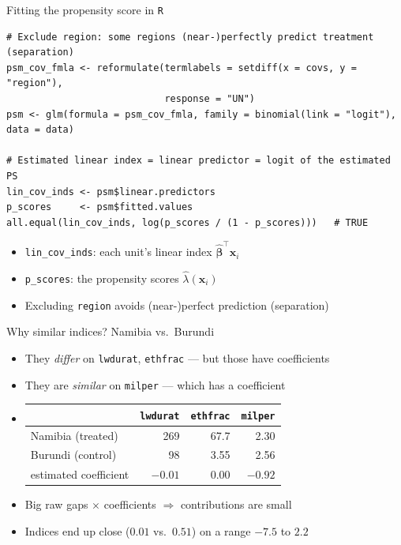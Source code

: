 \documentclass[table, xcolor = {dvipsnames}, 9pt]{beamer}
\theoremstyle{plain}
\newcommand{\mh}[1]{{\color{magenta}{#1}}}
\begin{document}
\begin{frame}[fragile]{Fitting the propensity score in \texttt{R}}
\begin{lstlisting}[style=Rstyle, basicstyle=\ttfamily\tiny, frame=single]
# Exclude region: some regions (near-)perfectly predict treatment (separation)
psm_cov_fmla <- reformulate(termlabels = setdiff(x = covs, y = "region"),
                            response = "UN")
psm <- glm(formula = psm_cov_fmla, family = binomial(link = "logit"), data = data)

# Estimated linear index = linear predictor = logit of the estimated PS
lin_cov_inds <- psm$linear.predictors
p_scores     <- psm$fitted.values
all.equal(lin_cov_inds, log(p_scores / (1 - p_scores)))   # TRUE
\end{lstlisting}
\begin{itemize} \vfill
\item \texttt{lin\_cov\_inds}: each unit's \mh{estimated} linear index $\bm{\hat{\beta}}^{\top}\bm{x}_i$ \vfill
\item \texttt{p\_scores}: the \mh{estimated} propensity scores $\hat{\lambda}(\bm{x}_i)$ \vfill
\item Excluding \texttt{region} avoids (near-)perfect prediction (separation) \vfill
\end{itemize}
\end{frame}
\begin{frame}{Why similar indices? Namibia vs.\ Burundi}
\vfill
\begin{itemize} \vfill
\item They \emph{differ} on \texttt{lwdurat}, \texttt{ethfrac} --- but those have \mh{small} coefficients \vfill
\item They are \emph{similar} on \texttt{milper} --- which has a \mh{large} coefficient \vfill
\item[]
\footnotesize
\begin{table}[H]
\centering
\begin{tabular}{lrrr}
\toprule
 & \texttt{lwdurat} & \texttt{ethfrac} & \texttt{milper} \\
\midrule
Namibia (treated) & 269 & 67.7 & 2.30 \\
Burundi (control) & 98 & 3.55 & 2.56 \\
estimated coefficient & $-0.01$ & $0.00$ & $-0.92$ \\
\bottomrule
\end{tabular}
\end{table}
\normalsize
\vfill
\item Big raw gaps $\times$ \mh{tiny} coefficients $\Rightarrow$ contributions are small \vfill
\item Indices end up close ($0.01$ vs.\ $0.51$) on a range $-7.5$ to $2.2$ \vfill
\end{itemize}
\end{frame}
\end{document}
